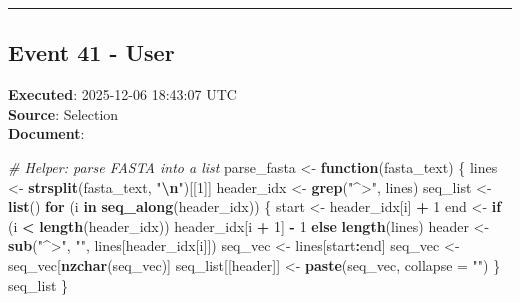 \documentclass[
  11pt,
]{article}
\newenvironment{Shaded}{\begin{snugshade}}{\end{snugshade}}
\newcommand{\AttributeTok}[1]{\textcolor[rgb]{0.13,0.29,0.53}{#1}}
\newcommand{\CommentTok}[1]{\textcolor[rgb]{0.56,0.35,0.01}{\textit{#1}}}
\newcommand{\ControlFlowTok}[1]{\textcolor[rgb]{0.13,0.29,0.53}{\textbf{#1}}}
\newcommand{\DecValTok}[1]{\textcolor[rgb]{0.00,0.00,0.81}{#1}}
\newcommand{\FunctionTok}[1]{\textcolor[rgb]{0.13,0.29,0.53}{\textbf{#1}}}
\newcommand{\NormalTok}[1]{#1}
\newcommand{\OtherTok}[1]{\textcolor[rgb]{0.56,0.35,0.01}{#1}}
\newcommand{\SpecialCharTok}[1]{\textcolor[rgb]{0.81,0.36,0.00}{\textbf{#1}}}
\newcommand{\StringTok}[1]{\textcolor[rgb]{0.31,0.60,0.02}{#1}}
\begin{document}
\begin{center}\rule{0.5\linewidth}{0.5pt}\end{center}

\subsection{Event 41 - User}\label{event-41---user}

\textbf{Executed}: 2025-12-06 18:43:07 UTC\\
\textbf{Source}: Selection\\
\textbf{Document}:

\begin{Shaded}
\begin{Highlighting}[]
\CommentTok{\# Helper: parse FASTA into a list}
\NormalTok{parse\_fasta }\OtherTok{\textless{}{-}} \ControlFlowTok{function}\NormalTok{(fasta\_text) \{}
\NormalTok{  lines }\OtherTok{\textless{}{-}} \FunctionTok{strsplit}\NormalTok{(fasta\_text, }\StringTok{"}\SpecialCharTok{\textbackslash{}n}\StringTok{"}\NormalTok{)[[}\DecValTok{1}\NormalTok{]]}
\NormalTok{  header\_idx }\OtherTok{\textless{}{-}} \FunctionTok{grep}\NormalTok{(}\StringTok{"\^{}\textgreater{}"}\NormalTok{, lines)}
\NormalTok{  seq\_list }\OtherTok{\textless{}{-}} \FunctionTok{list}\NormalTok{()}
  \ControlFlowTok{for}\NormalTok{ (i }\ControlFlowTok{in} \FunctionTok{seq\_along}\NormalTok{(header\_idx)) \{}
\NormalTok{    start }\OtherTok{\textless{}{-}}\NormalTok{ header\_idx[i] }\SpecialCharTok{+} \DecValTok{1}
\NormalTok{    end }\OtherTok{\textless{}{-}} \ControlFlowTok{if}\NormalTok{ (i }\SpecialCharTok{\textless{}} \FunctionTok{length}\NormalTok{(header\_idx)) header\_idx[i }\SpecialCharTok{+} \DecValTok{1}\NormalTok{] }\SpecialCharTok{{-}} \DecValTok{1} \ControlFlowTok{else} \FunctionTok{length}\NormalTok{(lines)}
\NormalTok{    header }\OtherTok{\textless{}{-}} \FunctionTok{sub}\NormalTok{(}\StringTok{"\^{}\textgreater{}"}\NormalTok{, }\StringTok{""}\NormalTok{, lines[header\_idx[i]])}
\NormalTok{    seq\_vec }\OtherTok{\textless{}{-}}\NormalTok{ lines[start}\SpecialCharTok{:}\NormalTok{end]}
\NormalTok{    seq\_vec }\OtherTok{\textless{}{-}}\NormalTok{ seq\_vec[}\FunctionTok{nzchar}\NormalTok{(seq\_vec)]}
\NormalTok{    seq\_list[[header]] }\OtherTok{\textless{}{-}} \FunctionTok{paste}\NormalTok{(seq\_vec, }\AttributeTok{collapse =} \StringTok{""}\NormalTok{)}
\NormalTok{  \}}
\NormalTok{  seq\_list}
\NormalTok{\}}
\end{Highlighting}
\end{Shaded}
\end{document}
